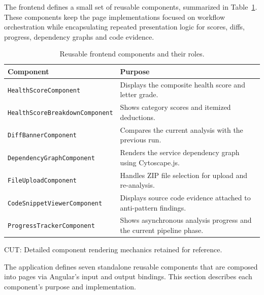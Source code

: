 \par The frontend defines a small set of reusable components, summarized in Table~\ref{tab:frontend-components}. These components keep the page implementations focused on workflow orchestration while encapsulating repeated presentation logic for scores, diffs, progress, dependency graphs and code evidence.

\begin{table}[htbp]
    \centering
    \footnotesize
    \begin{tabular}{|l|p{9cm}|}
        \hline
        \textbf{Component} & \textbf{Purpose} \\
        \hline\hline
        \texttt{HealthScoreComponent} & Displays the composite health score and letter grade. \\
        \hline
        \texttt{HealthScoreBreakdownComponent} & Shows category scores and itemized deductions. \\
        \hline
        \texttt{DiffBannerComponent} & Compares the current analysis with the previous run. \\
        \hline
        \texttt{DependencyGraphComponent} & Renders the service dependency graph using Cytoscape.js. \\
        \hline
        \texttt{FileUploadComponent} & Handles ZIP file selection for upload and re-analysis. \\
        \hline
        \texttt{CodeSnippetViewerComponent} & Displays source code evidence attached to anti-pattern findings. \\
        \hline
        \texttt{ProgressTrackerComponent} & Shows asynchronous analysis progress and the current pipeline phase. \\
        \hline
    \end{tabular}
    \caption{Reusable frontend components and their roles.}
    \label{tab:frontend-components}
\end{table}

\iffalse
CUT: Detailed component rendering mechanics retained for reference.
 \par The application defines seven standalone reusable components that are composed into pages via Angular's input and output bindings. This section describes each component's purpose and implementation.

